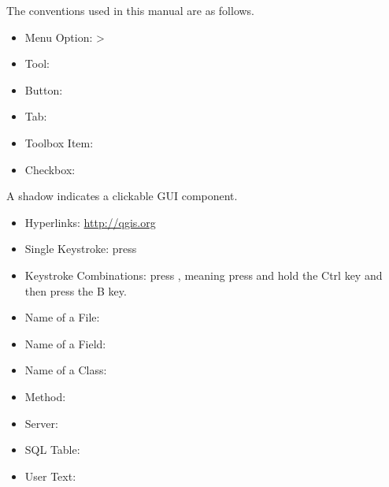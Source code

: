The conventions used in this manual are as follows. 

\begin{itemize}
%
\item Menu Option:  > %
%
%
\item Tool: 
%
\item Button: 
%
\item Tab: 
%
\item Toolbox Item: 
%
\item Checkbox: 
\end{itemize}
A shadow indicates a clickable GUI component.

\begin{itemize}
%
\item Hyperlinks: \url{http://qgis.org}
%
\item Single Keystroke: press 
\item Keystroke Combinations: press , meaning press and
hold the Ctrl key and then press the B key.
\item Name of a File: 
\item Name of a Field: 
\item Name of a Class: 
\item Method: 
\item Server: 
\item SQL Table:     
%
\item User Text: 
\end{itemize}

